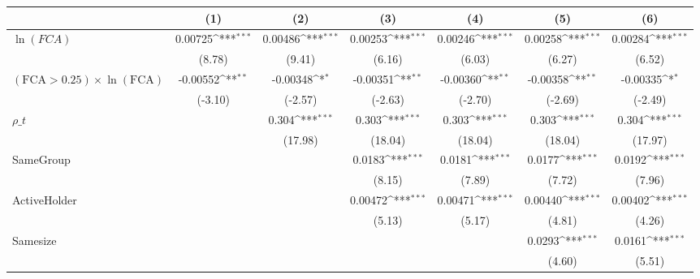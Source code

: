 {
\def\sym#1{\ifmmode^{#1}\else\(^{#1}\)\fi}
\begin{tabular}{l*{6}{c}}
\hline\hline
                    &\multicolumn{1}{c}{(1)}         &\multicolumn{1}{c}{(2)}         &\multicolumn{1}{c}{(3)}         &\multicolumn{1}{c}{(4)}         &\multicolumn{1}{c}{(5)}         &\multicolumn{1}{c}{(6)}         \\
\hline
$\ln(FCA)$          &     0.00725\sym{***}&     0.00486\sym{***}&     0.00253\sym{***}&     0.00246\sym{***}&     0.00258\sym{***}&     0.00284\sym{***}\\
                    &      (8.78)         &      (9.41)         &      (6.16)         &      (6.03)         &      (6.27)         &      (6.52)         \\
[1em]
 $ (\text{FCA} > 0.25) \times {\ln(\text{FCA})}  $ &    -0.00552\sym{**} &    -0.00348\sym{*}  &    -0.00351\sym{**} &    -0.00360\sym{**} &    -0.00358\sym{**} &    -0.00335\sym{*}  \\
                    &     (-3.10)         &     (-2.57)         &     (-2.63)         &     (-2.70)         &     (-2.69)         &     (-2.49)         \\
[1em]
$ \rho\_t $          &                     &       0.304\sym{***}&       0.303\sym{***}&       0.303\sym{***}&       0.303\sym{***}&       0.304\sym{***}\\
                    &                     &     (17.98)         &     (18.04)         &     (18.04)         &     (18.04)         &     (17.97)         \\
[1em]
SameGroup           &                     &                     &      0.0183\sym{***}&      0.0181\sym{***}&      0.0177\sym{***}&      0.0192\sym{***}\\
                    &                     &                     &      (8.15)         &      (7.89)         &      (7.72)         &      (7.96)         \\
[1em]
ActiveHolder        &                     &                     &     0.00472\sym{***}&     0.00471\sym{***}&     0.00440\sym{***}&     0.00402\sym{***}\\
                    &                     &                     &      (5.13)         &      (5.17)         &      (4.81)         &      (4.26)         \\
[1em]
Samesize            &                     &                     &                     &                     &      0.0293\sym{***}&      0.0161\sym{***}\\
                    &                     &                     &                     &                     &      (4.60)         &      (5.51)         \\

\end{tabular}}
